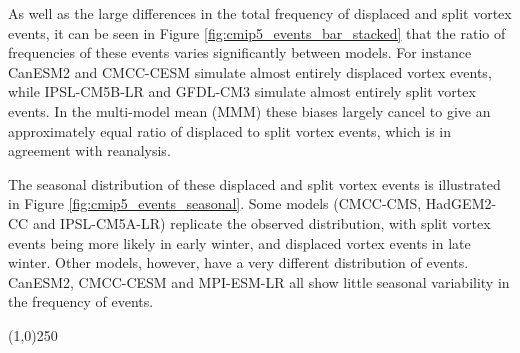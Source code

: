 As well as the large differences in the total frequency of displaced and split
vortex events, it can be seen in Figure \ref{fig:cmip5_events_bar_stacked} that
the ratio of frequencies of these events varies significantly between
models. For instance CanESM2 and CMCC-CESM simulate almost entirely displaced
vortex events, while IPSL-CM5B-LR and GFDL-CM3 simulate almost entirely split
vortex events. In the multi-model mean (MMM) these biases largely cancel to give
an approximately equal ratio of displaced to split vortex events, which is in
agreement with reanalysis.

The seasonal distribution of these displaced and split vortex events is
illustrated in Figure \ref{fig:cmip5_events_seasonal}. Some models (CMCC-CMS,
HadGEM2-CC and IPSL-CM5A-LR) replicate the observed distribution, with split
vortex events being more likely in early winter, and displaced vortex events in
late winter. Other models, however, have a very different
distribution of events. CanESM2, CMCC-CESM and MPI-ESM-LR all show little
seasonal variability in the frequency of events. 
\begin{center}
\line(1,0){250}
\end{center}

